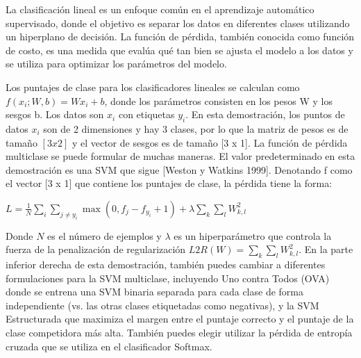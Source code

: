 \documentclass[twoside,10pt]{article}
\numberwithin{equation}{section}
\begin{document}
La clasificación lineal es un enfoque común en el aprendizaje automático supervisado, donde el objetivo es separar los datos en diferentes clases utilizando un hiperplano de decisión. La función de pérdida, también conocida como función de costo, es una medida que evalúa qué tan bien se ajusta el modelo a los datos y se utiliza para optimizar los parámetros del modelo.\cite{Linear-Classification}

Los puntajes de clase para los clasificadores lineales se calculan como $f(x_i; W, b) = W x_i + b$, donde los parámetros consisten en los pesos W y los sesgos b. Los datos son $x_i$ con etiquetas $y_i$. En esta demostración, los puntos de datos $x_i$ son de 2 dimensiones y hay 3 clases, por lo que la matriz de pesos es de tamaño $[3 x 2]$ y el vector de sesgos es de tamaño [3 x 1]. La función de pérdida multiclase se puede formular de muchas maneras. El valor predeterminado en esta demostración es una SVM que sigue [Weston y Watkins 1999]. Denotando f como el vector [3 x 1] que contiene los puntajes de clase, la pérdida tiene la forma:
\begin{center}
    $L = \frac{1}{N} \sum_i \sum_{j \neq y_i} \max(0, f_j - f_{y_i} + 1) + \lambda \sum_k\sum_l W_{k,l}^2$
\end{center}
Donde $N$ es el número de ejemplos y $\lambda$ es un hiperparámetro que controla la fuerza de la penalización de regularización $L2 R(W) = \sum_k\sum_l W_{k,l}^2$. En la parte inferior derecha de esta demostración, también puedes cambiar a diferentes formulaciones para la SVM multiclase, incluyendo Uno contra Todos (OVA) donde se entrena una SVM binaria separada para cada clase de forma independiente (vs. las otras clases etiquetadas como negativas), y la SVM Estructurada que maximiza el margen entre el puntaje correcto y el puntaje de la clase competidora más alta. También puedes elegir utilizar la pérdida de entropía cruzada que se utiliza en el clasificador Softmax. \cite{Linear-Classification-Loss}
\end{document}
